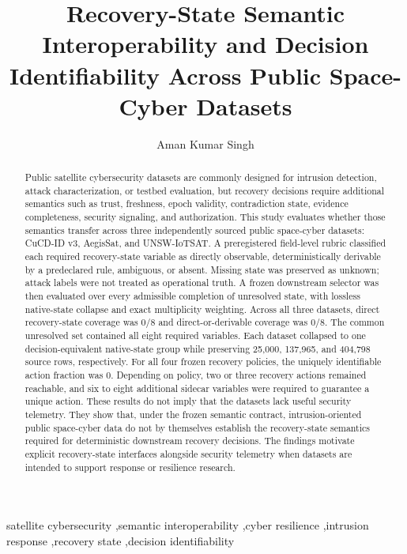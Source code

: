 \documentclass[preprint,12pt]{elsarticle}
\begin{document}
\begin{frontmatter}

\title{Recovery-State Semantic Interoperability and Decision Identifiability Across Public Space-Cyber Datasets}

\author[aff1]{Aman Kumar Singh}

\begin{abstract}
Public satellite cybersecurity datasets are commonly designed for intrusion detection, attack characterization, or testbed evaluation, but recovery decisions require additional semantics such as trust, freshness, epoch validity, contradiction state, evidence completeness, security signaling, and authorization. This study evaluates whether those semantics transfer across three independently sourced public space-cyber datasets: CuCD-ID v3, AegisSat, and UNSW-IoTSAT. A preregistered field-level rubric classified each required recovery-state variable as directly observable, deterministically derivable by a predeclared rule, ambiguous, or absent. Missing state was preserved as unknown; attack labels were not treated as operational truth. A frozen downstream selector was then evaluated over every admissible completion of unresolved state, with lossless native-state collapse and exact multiplicity weighting. Across all three datasets, direct recovery-state coverage was 0/8 and direct-or-derivable coverage was 0/8. The common unresolved set contained all eight required variables. Each dataset collapsed to one decision-equivalent native-state group while preserving 25,000, 137,965, and 404,798 source rows, respectively. For all four frozen recovery policies, the uniquely identifiable action fraction was 0. Depending on policy, two or three recovery actions remained reachable, and six to eight additional sidecar variables were required to guarantee a unique action. These results do not imply that the datasets lack useful security telemetry. They show that, under the frozen semantic contract, intrusion-oriented public space-cyber data do not by themselves establish the recovery-state semantics required for deterministic downstream recovery decisions. The findings motivate explicit recovery-state interfaces alongside security telemetry when datasets are intended to support response or resilience research.
\end{abstract}

\begin{keyword}
satellite cybersecurity \sep semantic interoperability \sep cyber resilience \sep intrusion response \sep recovery state \sep decision identifiability
\end{keyword}

\end{frontmatter}
\end{document}
